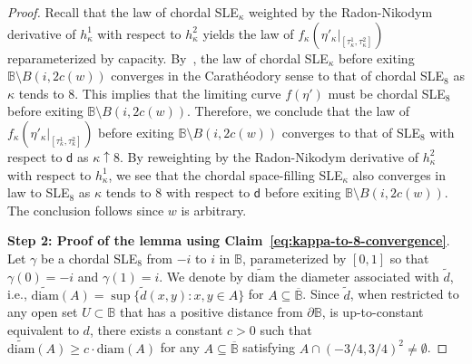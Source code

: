 \documentclass[a4paper]{article}
\numberwithin{equation}{section}
\numberwithin{equation}{section}
\renewcommand{\1}{\mathbf{1}}
\begin{document}
\begin{proof}
    Recall that the law of chordal SLE$_\kappa$ weighted by the Radon-Nikodym derivative of $h_\kappa^1$ with respect to $h_\kappa^2$ yields the law of $f_\kappa(\eta'_\kappa|_{[\tau_\kappa^1,\tau_\kappa^2]})$ reparameterized by capacity. By~\cite[Proposition 4.43]{Lawler-conformal}, the law of chordal SLE$_\kappa$ before exiting $\mathbb B \setminus B(i,2c(w))$ converges in the Carath\'eodory sense to that of chordal SLE$_8$ as $\kappa$ tends to 8. This implies that the limiting curve $f(\eta')$ must be chordal SLE$_8$ before exiting $\mathbb B \setminus B(i,2c(w))$. Therefore, we conclude that the law of $f_\kappa(\eta'_\kappa|_{[\tau_\kappa^1,\tau_\kappa^2]})$ before exiting $\mathbb B \setminus B(i,2c(w))$ converges to that of SLE$_8$ with respect to $\mathsf d$ as $\kappa \uparrow 8$. By reweighting by the Radon-Nikodym derivative of $h_\kappa^2$ with respect to $h_\kappa^1$, we see that the chordal space-filling SLE$_\kappa$ also converges in law to SLE$_8$ as $\kappa$ tends to 8 with respect to $\mathsf d$ before exiting $\mathbb B \setminus B(i,2c(w))$. The conclusion follows since $w$ is arbitrary.
    
    \textbf{Step 2: Proof of the lemma using Claim~\eqref{eq:kappa-to-8-convergence}}. Let $\gamma$ be a chordal SLE$_8$ from $-i$ to $i$ in $\mathbb B$, parameterized by $[0,1]$ so that $\gamma(0)=-i$ and $\gamma(1)=i$.
    We denote by $\widetilde{\mathrm{diam}}$ the diameter associated with $\widetilde d$, i.e., $\widetilde{\mathrm{diam}}(A)=\sup\{ \widetilde d(x,y): x,y \in A\}$ for $A \subseteq \overline{\mathbb B}$. Since $\widetilde d$, when restricted to any open set $U \subset \mathbb B$ that has a positive distance from $\partial \mathbb B$, is up-to-constant equivalent to $d$, there exists a constant $c>0$ such that $\widetilde{\mathrm{diam}}(A) \ge c \cdot \mathrm{diam}(A) $ for any $A \subseteq \overline{\mathbb B}$ satisfying $A \cap (-3/4,3/4)^2 \neq \emptyset$.


\end{proof}
\end{document}
